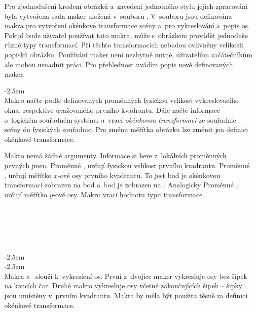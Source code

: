 \documentclass[12pt]{article}
\begin{document}
\medskip
Pro zjednodušení kreslení obrázků a~zavedení jednotného stylu jejich zpracování
byla vytvořena sada maker uložená v~souboru . V~souboru jsou
definována makra pro vytvoření okénkové transformace scény a~pro vykreslování 
a~popis os. Pokud bude uživatel používat tato makra, může s~obrázkem provádět
jednoduše různé typy transformací. Při těchto transformacích nebudou ovlivněny
velikosti popisků obrázku. Používání maker není nezbytně nutné, uživatelům
začátečníkům ale mohou usnadnit práci. Pro přehlednost uvádím popis 
nově definovaných maker.

\medskip\bgroup
\noindent%
%
\addtolength{\leftskip}{2.5em}\parindent=0pt%
\null \kern-2.5em \\[2pt]
Makro  načte podle definovaných proměnných
fyzickou velikost vykreslovacího okna, respektive uvažovaného prvního 
kvadrantu. Dále načte informace o~logickém souřadném systému a~vrací 
\emph{okénkovou transformaci} ze souřadnic scény do fyzických souřadnic.
Pro změnu měřítka obrázku lze změnit jen definici okénkové transformace.

\smallskip
Makro  nemá žádné argumenty. Informace si bere
z~lokálních proměnných pevných jmen. Proměnné ,  určují fyzickou
velikost prvního kvadrantu. Proměnné ,  určují měřítko $x$-ové
osy prvního kvadrantu. To jest bod  je okénkovou transformací
zobrazen na bod  a~bod 
je zobrazen na . Analogicky Proměnné , 
určují měřítko $y$-ové osy. Makro vrací hodnotu typu transformace.

\begin{example}
   \\
   \\
   \\
   \\
\end{example}
\par\egroup

\medskip\bgroup
\noindent%
%
%
\addtolength{\leftskip}{2.5em}\parindent=0pt%
\null \kern-2.5em \\
\null \kern-2.5em \\[2pt]
Makra  a~
slouží k~vykreslení os. První z~dvojice maker vykresluje osy bez šipek
na koncích čar. Druhé makro vykresluje osy včetně zakončujících šipek -- šipky
jsou umístěny v~prvním kvadrantu. 
Makra by měla být použita těsně za definicí okénkové transformace.
\end{document}
